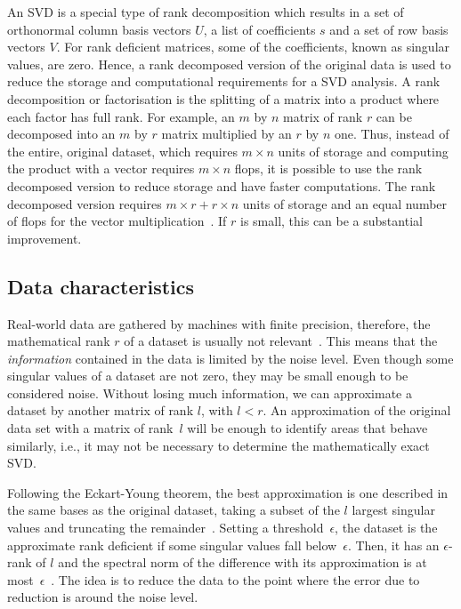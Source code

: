\documentclass[ijgi,article,submit,moreauthors,pdftex,10pt,a4paper]{Definitions/mdpi}
\begin{document}
An SVD is a special type of rank decomposition which results in a set of orthonormal column basis vectors $U$, a list of coefficients $s$ and a set of row basis vectors $V$. For rank deficient matrices, some of the coefficients, known as singular values, are zero. Hence, a rank decomposed version of the original data is used to reduce the storage and computational requirements for a SVD analysis. A rank decomposition or factorisation is the splitting of a matrix into a product where each factor has full rank. For example, an $m$ by $n$ matrix of rank $r$ can be decomposed into an $m$ by $r$ matrix multiplied by an $r$ by $n$ one. Thus, instead of the entire, original dataset, which requires $m \times n$ units of storage and computing the product with a vector requires $m \times n$ flops, it is possible to use the rank decomposed version to reduce storage and have faster computations. The rank decomposed version requires $m \times r + r \times n$ units of storage and an equal number of flops for the vector multiplication~\cite{Martinsson2016}. If $r$ is small, this can be a substantial improvement. 

\subsection{Data characteristics}
Real-world data are gathered by machines with finite precision, therefore, the mathematical rank $r$ of a dataset is usually not relevant~\cite{Martinsson2016}. This means that the \textit{information} contained in the data is limited by the noise level. Even though some singular values of a dataset are not zero, they may be small enough to be considered noise. Without losing much information, we can approximate a dataset by another matrix of rank $l$, with $l < r$. An approximation of the original data set with a matrix of rank~$l$ will be enough to identify areas that behave similarly, i.e., it may not be necessary to determine the mathematically exact SVD. 

Following the Eckart-Young theorem, the best approximation is one described in the same bases as the original dataset, taking a subset of the $l$ largest singular values and truncating the remainder~\cite{Eckart1936}. Setting a threshold~$\epsilon$, the dataset is the approximate rank deficient if some singular values fall below~$\epsilon$. Then, it has an $\epsilon$-rank of $l$ and the spectral norm of the difference with its approximation is at most~$\epsilon$~\cite{Martinsson2016}. The idea is to reduce the data to the point where the error due to reduction is around the noise level. 
\end{document}
